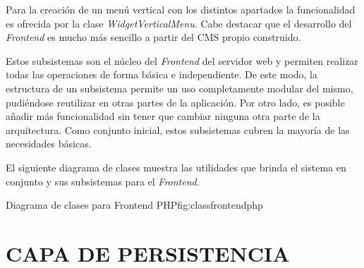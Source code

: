 Para la creación de un menú vertical con los distintos apartados la
funcionalidad es ofrecida por la clase \emph{WidgetVerticalMenu}. Cabe destacar
que el desarrollo del \emph{Frontend} es mucho más sencillo a partir del CMS 
propio construido.

Estos subsistemas son el núcleo del \emph{Frontend} del servidor web y permiten
realizar todas las operaciones de forma básica e independiente. De este modo, la estructura
de un subsistema permite un uso completamente modular del mismo, pudiéndose
reutilizar en otras partes de la aplicación. Por otro lado, es posible añadir
más funcionalidad sin tener que cambiar ninguna otra parte de la arquitectura.
Como conjunto inicial, estos subsistemas cubren la mayoría de las
necesidades básicas.

El siguiente diagrama de clases muestra las utilidades que brinda el sistema
en conjunto y sus subsistemas para el \emph{Frontend}.

\newpage

%
{Diagrama de clases para Frontend PHP}{fig:classfrontendphp}

\newpage

\section{\uppercase{Capa de persistencia}}


